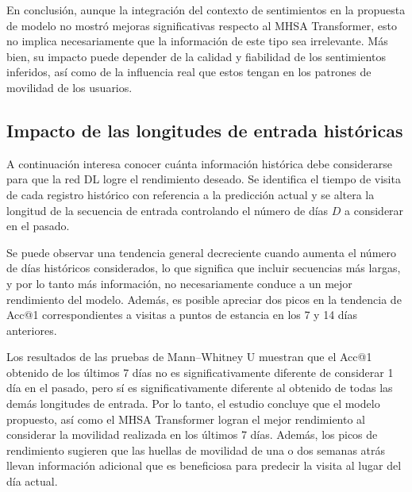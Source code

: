 En conclusión, aunque la integración del contexto de 
sentimientos en la propuesta de modelo no mostró mejoras 
significativas respecto al MHSA Transformer, esto no 
implica necesariamente que la información de este tipo sea 
irrelevante. Más bien, su impacto puede depender de la 
calidad y fiabilidad de los sentimientos inferidos, 
así como de la influencia real que estos tengan en 
los patrones de movilidad de los usuarios.

\subsection{Impacto de las longitudes de entrada históricas}
A continuación interesa conocer cuánta información histórica 
debe considerarse para que la red DL logre el rendimiento deseado. 
Se identifica el tiempo de visita de cada registro histórico con 
referencia a la predicción actual y se altera la longitud de la 
secuencia de entrada controlando el número de días $D$ a considerar 
en el pasado. 

Se puede 
observar una tendencia general decreciente cuando aumenta el 
número de días históricos considerados, lo que significa que 
incluir secuencias más largas, y por lo tanto más información, 
no necesariamente conduce a un mejor rendimiento del modelo. 
Además, es posible apreciar dos picos en la tendencia de Acc@1 
correspondientes a visitas a puntos de estancia en los 7 y 14 días 
anteriores. 

Los resultados de las pruebas de Mann–Whitney U 
muestran que el Acc@1 obtenido de los últimos 7 días no es 
significativamente diferente de considerar 1 día en el 
pasado, pero sí es significativamente 
diferente al obtenido de todas las demás longitudes de entrada. 
Por lo tanto, el estudio concluye 
que el modelo propuesto, as\'i como el MHSA Transformer logran el mejor rendimiento 
al considerar la movilidad realizada en los últimos 7 días. 
Además, los picos de rendimiento sugieren que las huellas de 
movilidad de una o dos semanas atrás llevan información adicional 
que es beneficiosa para predecir la visita al lugar del día actual.
